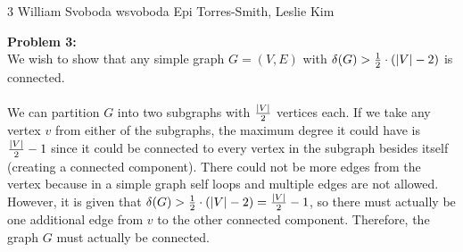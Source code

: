 \documentclass[12pt,letterpaper]{cos340hw}
\begin{document}
           {3}            %
           {William Svoboda}  %
           {wsvoboda}   %
           {Epi Torres-Smith, Leslie Kim} 




\noindent\textbf{Problem 3:}\\
We wish to show that any simple graph $G=(V,E)$ with $\delta(G)>\frac{1}{2}\cdot(\left| V \right|-2)$ is 
connected.\\\\
We can partition $G$ into two subgraphs with $\frac{\left| V \right|}{2}$ vertices each. If we take 
any vertex $v$ from either of the subgraphs, the maximum degree it could have is 
$\frac{\left| V \right|}{2}-1$ since it could be connected to every vertex in the subgraph besides 
itself (creating a connected component). There could not be more edges from the vertex because in a 
simple graph self loops and multiple edges are not allowed. However, it is given that 
$\delta(G)>\frac{1}{2}\cdot(\left| V \right|-2)=\frac{\left| V \right|}{2}-1$, so there must actually be one additional edge 
from $v$ to the other connected component. Therefore, the graph $G$ must actually be connected.


\end{document}
